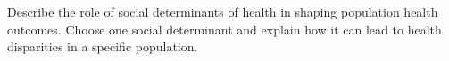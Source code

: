 \documentclass[a4paper]{exam}
\begin{document}
\begin{questions}
    \begin{solution}
        
    \end{solution}

    \question[10]
    Describe the role of social determinants of health in shaping population health outcomes. Choose one social determinant and explain how it can lead to health disparities in a specific population.
    \begin{solution}
        
    \end{solution}

\end{questions}
\end{document}
